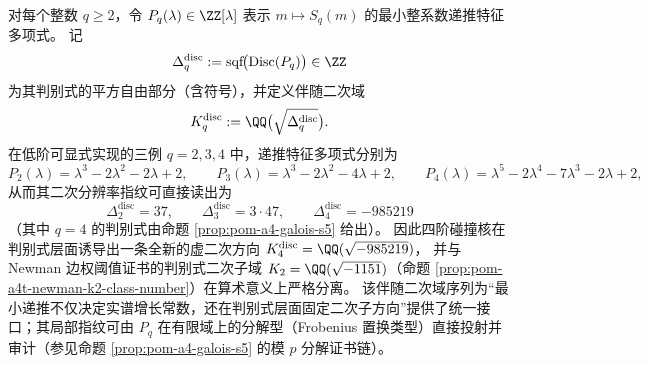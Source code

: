 \begin{remark}\label{rem:pom-discriminant-quadratic-field-tower}
对每个整数 \(q\ge 2\)，令 \(P_q(\lambda)\in\ZZ[\lambda]\) 表示 \(m\mapsto S_q(m)\) 的最小整系数递推特征多项式。
记
\[
\Delta_q^{\mathrm{disc}}:=\mathrm{sqf}\!\bigl(\mathrm{Disc}(P_q)\bigr)\in\ZZ
\]
为其判别式的平方自由部分（含符号），并定义伴随二次域
\[
K_q^{\mathrm{disc}}:=\QQ\bigl(\sqrt{\Delta_q^{\mathrm{disc}}}\bigr).
\]
在低阶可显式实现的三例 \(q=2,3,4\) 中，递推特征多项式分别为
\[
P_2(\lambda)=\lambda^3-2\lambda^2-2\lambda+2,\qquad
P_3(\lambda)=\lambda^3-2\lambda^2-4\lambda+2,\qquad
P_4(\lambda)=\lambda^5-2\lambda^4-7\lambda^3-2\lambda+2,
\]
从而其二次分辨率指纹可直接读出为
\[
\Delta_2^{\mathrm{disc}}=37,\qquad
\Delta_3^{\mathrm{disc}}=3\cdot 47,\qquad
\Delta_4^{\mathrm{disc}}=-985219
\]
（其中 \(q=4\) 的判别式由命题 \ref{prop:pom-a4-galois-s5} 给出）。
因此四阶碰撞核在判别式层面诱导出一条全新的虚二次方向
\(
K_4^{\mathrm{disc}}=\QQ(\sqrt{-985219})
\)，
并与 Newman 边权阈值证书的判别式二次子域 \(K_2=\QQ(\sqrt{-1151})\)（命题 \ref{prop:pom-a4t-newman-k2-class-number}）在算术意义上严格分离。
该伴随二次域序列为“最小递推不仅决定实谱增长常数，还在判别式层面固定二次子方向”提供了统一接口；其局部指纹可由 \(P_q\) 在有限域上的分解型（Frobenius 置换类型）直接投射并审计（参见命题 \ref{prop:pom-a4-galois-s5} 的模 \(p\) 分解证书链）。
\end{remark}

